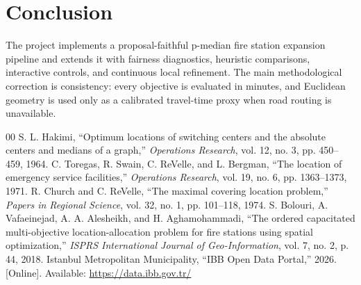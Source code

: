 \documentclass[conference]{IEEEtran}
\begin{document}
\section{Conclusion}
The project implements a proposal-faithful p-median fire station expansion pipeline and extends it with fairness diagnostics, heuristic comparisons, interactive controls, and continuous local refinement. The main methodological correction is consistency: every objective is evaluated in minutes, and Euclidean geometry is used only as a calibrated travel-time proxy when road routing is unavailable.

\begin{thebibliography}{00}
 S. L. Hakimi, ``Optimum locations of switching centers and the absolute centers and medians of a graph,'' \emph{Operations Research}, vol. 12, no. 3, pp. 450--459, 1964.
 C. Toregas, R. Swain, C. ReVelle, and L. Bergman, ``The location of emergency service facilities,'' \emph{Operations Research}, vol. 19, no. 6, pp. 1363--1373, 1971.
 R. Church and C. ReVelle, ``The maximal covering location problem,'' \emph{Papers in Regional Science}, vol. 32, no. 1, pp. 101--118, 1974.
 S. Bolouri, A. Vafaeinejad, A. A. Alesheikh, and H. Aghamohammadi, ``The ordered capacitated multi-objective location-allocation problem for fire stations using spatial optimization,'' \emph{ISPRS International Journal of Geo-Information}, vol. 7, no. 2, p. 44, 2018.
 Istanbul Metropolitan Municipality, ``IBB Open Data Portal,'' 2026. [Online]. Available: \url{https://data.ibb.gov.tr/}
\end{thebibliography}
\end{document}
